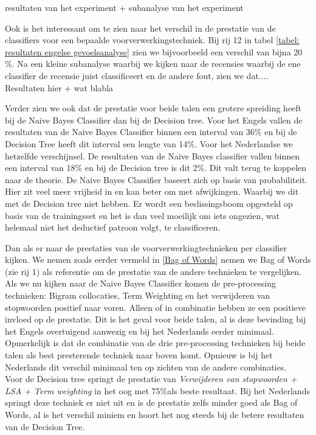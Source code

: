 resultaten van het experiment + subanalyse van het experiment 

Ook is het interessant om te zien naar het verschil in de prestatie van de classifiers voor een bepaalde voorverwerkingstechniek. Bij rij 12 in tabel \ref{tabel: resultaten engelse gevoelsanalyse} zien we bijvoorbeeld een verschil van bijna 20 \%. Na een kleine subanalyse waarbij we kijken naar de recensies waarbij de ene classifier de recensie juist classificeert en de andere fout, zien we dat....\\

Resultaten hier + wat blabla

Verder zien we ook dat de prestatie voor beide talen een grotere spreiding heeft bij de Naive Bayes Classifier dan bij de Decision tree. Voor het Engels vallen de resultaten van de Naive Bayes Classifier binnen een interval van 36\% en bij de Decision Tree heeft dit interval een lengte van 14\%. Voor het Nederlandse we hetzelfde verschijnsel. De resultaten van de Naive Bayes classifier vallen binnen een interval van 18\% en bij de Decision tree is dit 2\%. Dit valt terug te koppelen naar de theorie. De Naive Bayes Classifier baseert zich op basis van probabiliteit. Hier zit veel meer vrijheid in en kan beter om met afwijkingen. Waarbij we dit met de Decision tree niet hebben. Er wordt een beslissingsboom opgesteld op basis van de trainingsset en het is dan veel moeilijk om iets ongezien, wat helemaal niet het deductief patroon volgt, te classificeren.

Dan als er naar de prestaties van de voorverwerkingtechnieken per classifier kijken. We nemen zoals eerder vermeld in \ref{Bag of Words} nemen we Bag of Words (zie rij 1) als referentie om de prestatie van de andere technieken te vergelijken.\\
Als we nu kijken naar de Naive Bayes Classifier komen de pre-processing technieken: Bigram collocaties, Term Weighting en het verwijderen van stopwoorden positief naar voren. Alleen of in combinatie hebben ze een positieve invloed op de prestatie. Dit is het geval voor beide talen, al is deze bevinding bij het Engels overtuigend aanwezig en bij het Nederlands eerder minimaal. Opmerkelijk is dat de combinatie van de drie pre-processing technieken bij beide talen als best presterende techniek naar boven komt. Opnieuw is bij het Nederlands dit verschil minimaal ten op zichten van de andere combinaties.\\
Voor de Decision tree springt de prestatie van \textit{Verwijderen van stopwoorden + LSA + Term weighting} in het oog met 75\%als beste resultaat. Bij het Nederlands springt deze techniek er niet uit en is de prestatie zelfs minder goed als Bag of Words, al is het verschil miniem en hoort het nog steeds bij de betere resultaten van de Decision Tree.\\

